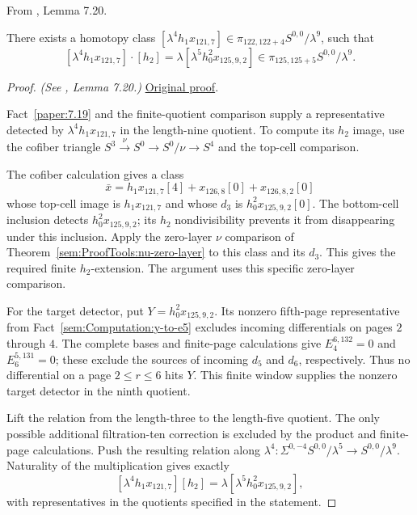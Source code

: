 \begin{lemma}
\label{paper:7.20}
From \cite{LWX126}, Lemma 7.20.\par

\label{lem:nuext125}
    There exists a homotopy class $[\lambda^4 h_1 x_{121,7}] \in \pi_{122,122+4}S^{0,0}/\lambda^9$, such that
    $$[\lambda^4 h_1 x_{121,7}] \cdot [h_2] = \lambda [\lambda^5 h_0^2 x_{125,9,2}] \in \pi_{125,125+5} S^{0,0}/\lambda^9.$$



\end{lemma}
\begin{proof}
\textit{(See \cite{LWX126}, Lemma 7.20.)} \href{paper/main.tex.html#L2622}{Original proof}.

Fact~\ref{paper:7.19} and the finite-quotient comparison supply a representative detected by $\lambda^4h_1x_{121,7}$ in the length-nine quotient. To compute its $h_2$ image, use the cofiber triangle $S^3\xrightarrow{\nu}S^0\to S^0/\nu\to S^4$ and the top-cell comparison.

The cofiber calculation gives a class
\[
 \bar x=h_1x_{121,7}[4]+x_{126,8}[0]+x_{126,8,2}[0]
\]
whose top-cell image is $h_1x_{121,7}$ and whose $d_3$ is
$h_0^2x_{125,9,2}[0]$. The bottom-cell inclusion detects
$h_0^2x_{125,9,2}$; its $h_2$ nondivisibility prevents it from
disappearing under this inclusion. Apply the zero-layer $\nu$ comparison
of Theorem~\ref{sem:ProofTools:nu-zero-layer} to this class and its
$d_3$. This gives the required finite $h_2$-extension. The argument uses this specific zero-layer comparison.

For the target detector, put $Y=h_0^2x_{125,9,2}$. Its nonzero
fifth-page representative from Fact~\ref{sem:Computation:y-to-e5}
excludes incoming differentials on pages $2$ through $4$. The complete
bases and finite-page calculations give $E_4^{6,132}=0$ and $E_6^{5,131}=0$;
these exclude the sources of incoming $d_5$ and $d_6$, respectively.
Thus no differential on a page $2\leq r\leq6$ hits $Y$. This finite
window supplies the nonzero target detector in the ninth quotient.

Lift the relation from the length-three to the length-five quotient. The only possible additional filtration-ten correction is excluded by the product and finite-page calculations. Push the resulting relation along $\lambda^4: \Sigma^{0,-4}S^{0,0}/\lambda^5\to S^{0,0}/\lambda^9$. Naturality of the multiplication gives exactly
\[
 [\lambda^4h_1x_{121,7}][h_2]
       =\lambda[\lambda^5h_0^2x_{125,9,2}],
\]
with representatives in the quotients specified in the statement.
\end{proof}

